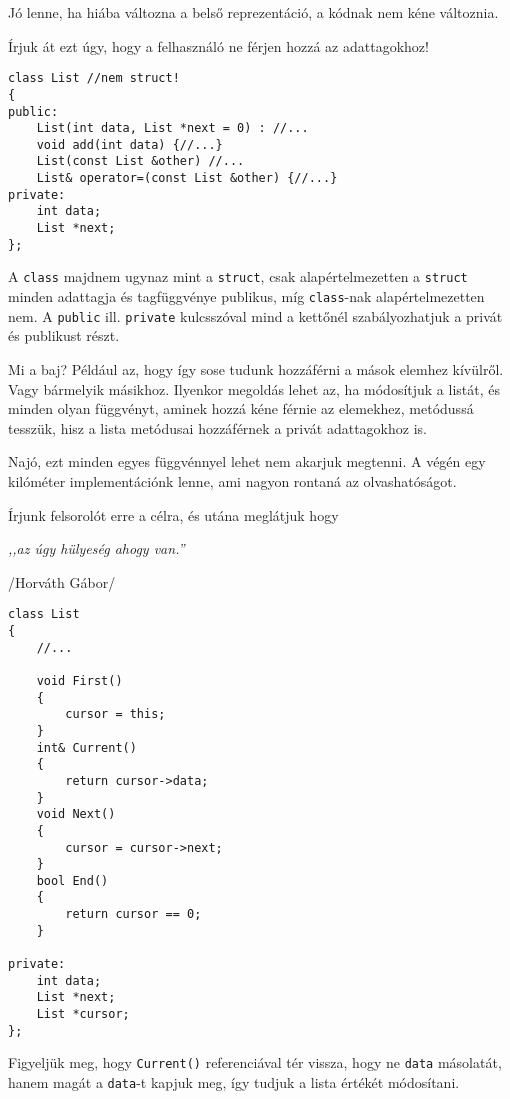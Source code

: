 \documentclass[a4paper,11.5pt]{article}
\begin{document}
	Jó lenne, ha hiába változna a belső reprezentáció, a kódnak nem kéne változnia. 
	
	Írjuk át ezt úgy, hogy a felhasználó ne férjen hozzá az adattagokhoz!

\begin{lstlisting}
class List //nem struct!
{
public:
	List(int data, List *next = 0) : //...
	void add(int data) {//...}
	List(const List &other) //...
	List& operator=(const List &other) {//...}
private:
	int data;
	List *next;
};
\end{lstlisting}
	A \texttt{class} majdnem ugynaz mint a \texttt{struct}, csak alapértelmezetten a \texttt{struct} minden adattagja és tagfüggvénye publikus, míg \texttt{class}-nak alapértelmezetten nem. A \texttt{public} ill. \texttt{private} kulcsszóval mind a kettőnél szabályozhatjuk a privát és publikust részt.
	
	\medskip
	Mi a baj? Például az, hogy így sose tudunk hozzáférni a mások elemhez kívülről. Vagy bármelyik másikhoz. Ilyenkor megoldás lehet az, ha módosítjuk a listát, és minden olyan függvényt,  aminek hozzá kéne férnie az elemekhez, metódussá tesszük, hisz a lista metódusai hozzáférnek a privát adattagokhoz is.
	
	Najó, ezt minden egyes függvénnyel lehet nem akarjuk megtenni. A végén egy kilóméter implementációnk lenne, ami nagyon rontaná az olvashatóságot.
	
	Írjunk felsorolót erre a célra, és utána meglátjuk hogy
	\begin{center}
		\textit{,,az úgy hülyeség ahogy van.''}
		
		/Horváth Gábor/
	\end{center}
\begin{lstlisting}
class List
{
	//...
	
	void First()
	{
		cursor = this;
	}
	int& Current()
	{
		return cursor->data;
	}
	void Next()
	{
		cursor = cursor->next;
	}	
	bool End()
	{
		return cursor == 0;
	}
	
private:
	int data;
	List *next;
	List *cursor;
};
\end{lstlisting}
	Figyeljük meg, hogy \texttt{Current()} referenciával tér vissza, hogy ne \texttt{data} másolatát, hanem magát a \texttt{data}-t kapjuk meg, így tudjuk a lista értékét módosítani.
	
\end{document}
